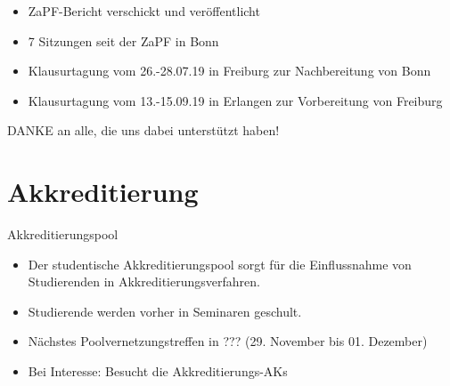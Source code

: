 \documentclass[compress, aspectratio=169]{beamer}
\begin{document}
\begin{frame}
  \begin{itemize}
    \item ZaPF-Bericht verschickt und veröffentlicht
    \item 7 Sitzungen seit der ZaPF in Bonn
    \item Klausurtagung vom 26.-28.07.19 in Freiburg zur Nachbereitung von Bonn
    \item Klausurtagung vom 13.-15.09.19 in Erlangen zur Vorbereitung von Freiburg
    \end{itemize}
    \vspace{5mm}
    \begin{center}
      \Large DANKE an alle, die uns dabei unterstützt haben!
    \end{center}
\end{frame}




\section{Akkreditierung}

\begin{frame}{Akkreditierungspool}
    \begin{itemize}
        \item Der studentische Akkreditierungspool sorgt für die Einflussnahme von Studierenden in Akkreditierungsverfahren.
        \item Studierende werden vorher in Seminaren geschult.
        \item Nächstes Poolvernetzungstreffen in ??? (29. November bis 01. Dezember)
        \vspace{0.5cm}
        \item[\rightarrow] Bei Interesse: Besucht die Akkreditierungs-AKs
    \end{itemize}
\end{frame}
\end{document}
